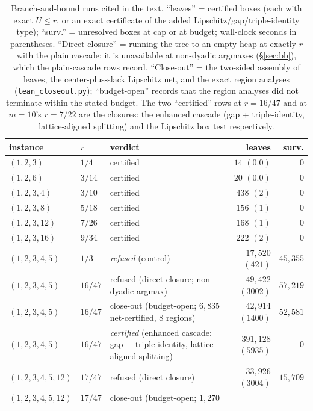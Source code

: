 \begin{table}[htbp]
\centering
\small
\caption{Branch-and-bound runs cited in the text. ``leaves'' = certified
boxes (each with exact $U\le r$, or an exact certificate of the added
Lipschitz/gap/triple-identity type); ``surv.'' = unresolved boxes at cap
or at budget; wall-clock seconds in parentheses. ``Direct closure'' =
running the tree to an empty heap at exactly $r$ with the plain
cascade; it is unavailable at non-dyadic argmaxes (\S\ref{sec:bb}),
which the plain-cascade rows record. ``Close-out'' = the two-sided
assembly of leaves, the center-plus-slack Lipschitz net, and the exact
region analyses (\texttt{lean\_closeout.py}); ``budget-open'' records
that the region analyses did not terminate within the stated budget.
The two ``certified'' rows at $r=16/47$ and at $m=10$'s $r=7/22$ are
the closures: the enhanced cascade (gap + triple-identity,
lattice-aligned splitting) and the Lipschitz box test respectively.}
\label{tab:certs}
\begin{tabularx}{\textwidth}{@{} l l >{\raggedright\arraybackslash}X r r @{}}
\toprule
instance & $r$ & verdict & leaves & surv. \\
\midrule
$(1,2,3)$ & $1/4$ & certified & $14$ $(0.0)$ & $0$ \\
$(1,2,6)$ & $3/14$ & certified & $20$ $(0.0)$ & $0$ \\
$(1,2,3,4)$ & $3/10$ & certified & $438$ $(2)$ & $0$ \\
$(1,2,3,8)$ & $5/18$ & certified & $156$ $(1)$ & $0$ \\
$(1,2,3,12)$ & $7/26$ & certified & $168$ $(1)$ & $0$ \\
$(1,2,3,16)$ & $9/34$ & certified & $222$ $(2)$ & $0$ \\
$(1,2,3,4,5)$ & $1/3$ & \emph{refused} (control) & $17{,}520$ $(421)$
& $45{,}355$ \\
$(1,2,3,4,5)$ & $16/47$ & refused (direct closure; non-dyadic argmax)
& $49{,}422$ $(3002)$ & $57{,}219$ \\
$(1,2,3,4,5)$ & $16/47$ & close-out (budget-open; $6{,}835$
net-certified, $8$ regions) & $42{,}914$ $(1400)$ & $52{,}581$ \\
$(1,2,3,4,5)$ & $16/47$ & \emph{certified} (enhanced cascade: gap +
triple-identity, lattice-aligned splitting) & $391{,}128$ $(5935)$ &
$0$ \\
$(1,2,3,4,5,12)$ & $17/47$ & refused (direct closure) & $33{,}926$
$(3004)$ & $15{,}709$ \\
$(1,2,3,4,5,12)$ & $17/47$ & close-out (budget-open; $1{,}270$

\end{tabularx}
\end{table}
